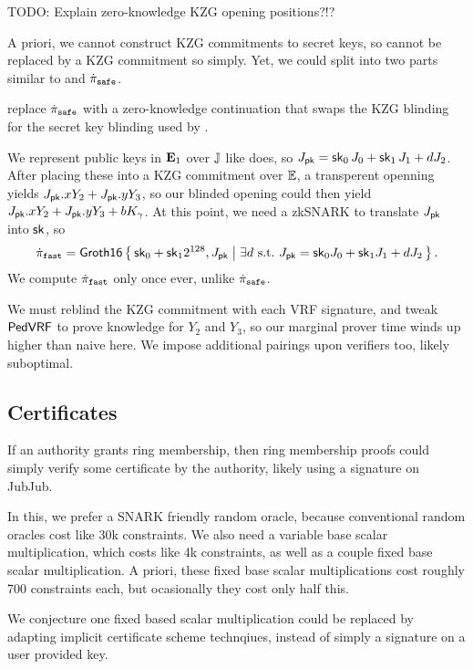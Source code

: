 TODO: Explain zero-knowledge KZG opening positions?!?

A priori, we cannot construct KZG commitments to secret keys,
so \pifast cannot be replaced by a KZG commitment so simply.
Yet, we could split \pifast into two parts similar to \pisafe and $\dot{\pi}_{\mathtt{safe}}$.

replace $\dot{\pi}_{\mathtt{safe}}$ with a zero-knowledge continuation
that swaps the KZG blinding for the secret key blinding used by \pifast.

We represent public keys in ${\mathbf{E}}_1$ over ${\mathbb{J}}$ like \pifast does,
so $J_\mathsf{pk} = \mathsf{sk}_0\, J_0 + \mathsf{sk}_1\, J_1 + d J_2$.
After placing these into a KZG commitment over ${\mathbb{E}}$, a transperent
openning yields $J_\mathsf{pk}.x Y_2 + J_\mathsf{pk}.y Y_3$, so our blinded opening could
then yield $J_\mathsf{pk}.x Y_2 + J_\mathsf{pk}.y Y_3 + b K_\gamma$.
At this point, we need a zkSNARK \pifastdot to translate $J_\mathsf{pk}$ into $\mathsf{sk}$, so
$$ \pifastdot = \rrSNARK \Setst{ \sk_0 + \sk_1 2^{128}, J_\pk }{ 
 \exists d \textrm{\ s.t.\ }
 J_\pk = \sk_0 \genJ_0 + \sk_1 \genJ_1 + d \genJ_2
} \mathperiod $$
We compute $\dot{\pi}_{\mathtt{fast}}$ only once ever, unlike $\dot{\pi}_{\mathtt{safe}}$.

We must reblind the KZG commitment with each VRF signature, and
tweak ${\mathsf{PedVRF}}$ to prove knowledge for $Y_2$ and $Y_3$, so 
our marginal prover time winds up higher than naive \pifast here.
We impose additional pairings upon verifiers too, likely suboptimal.


\subsection{Certificates} %

If an authority grants ring membership, then ring membership proofs
could simply verify some certificate by the authority, likely using
a signature on JubJub.

In this, we prefer a SNARK friendly random oracle,
because conventional random oracles cost like 30k constraints.
We also need a variable base scalar multiplication, which costs like
4k constraints, as well as a couple fixed base scalar multiplication.
A priori, these fixed base scalar multiplications cost roughly 700
constraints each, but ocasionally they cost only half this.   

We conjecture one fixed based scalar multiplication could be replaced
by adapting implicit certificate scheme technqiues,
 instead of simply a signature on a user provided key.

